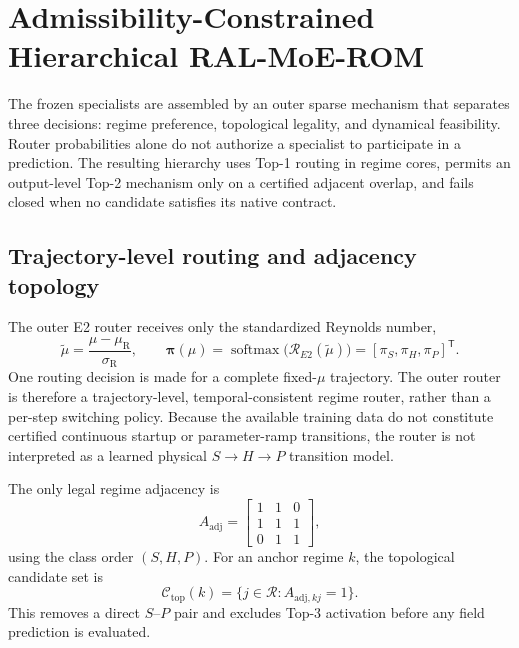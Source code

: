 \section{Admissibility-Constrained Hierarchical RAL-MoE-ROM}
\label{sec:hierarchical_ral_moe}

The frozen specialists are assembled by an outer sparse mechanism that
separates three decisions: regime preference, topological legality, and
dynamical feasibility.  Router probabilities alone do not authorize a
specialist to participate in a prediction.  The resulting hierarchy uses
Top-1 routing in regime cores, permits an output-level Top-2 mechanism only
on a certified adjacent overlap, and fails closed when no candidate satisfies
its native contract.



\subsection{Trajectory-level routing and adjacency topology}
\label{subsec:trajectory_router_topology}

The outer E2 router receives only the standardized Reynolds number,
\begin{equation}
  \widetilde{\mu}
  =
  \frac{\mu-\mu_{\mathrm{R}}}{\sigma_{\mathrm{R}}},
  \qquad
  \boldsymbol{\pi}(\mu)
  =
  \operatorname{softmax}
  \bigl(\mathcal{R}_{E2}(\widetilde{\mu})\bigr)
  =
  [\pi_S,\pi_H,\pi_P]^{\mathsf T}.
  \label{eq:e2_outer_router}
\end{equation}
One routing decision is made for a complete fixed-$\mu$ trajectory.  The
outer router is therefore a trajectory-level, temporal-consistent regime
router, rather than a per-step switching policy.  Because the available
training data do not constitute certified continuous startup or
parameter-ramp transitions, the router is not interpreted as a learned
physical $S\!\to\!H\!\to\!P$ transition model.

The only legal regime adjacency is
\begin{equation}
  A_{\mathrm{adj}}
  =
  \begin{bmatrix}
    1&1&0\\
    1&1&1\\
    0&1&1
  \end{bmatrix},
  \label{eq:adjacency_matrix}
\end{equation}
using the class order $(S,H,P)$.  For an anchor regime $k$, the topological
candidate set is
\begin{equation}
  \mathcal{C}_{\mathrm{top}}(k)
  =
  \{j\in\mathcal{R}:A_{\mathrm{adj},kj}=1\}.
  \label{eq:topological_candidate_set}
\end{equation}
This removes a direct $S$--$P$ pair and excludes Top-3 activation before any
field prediction is evaluated.

